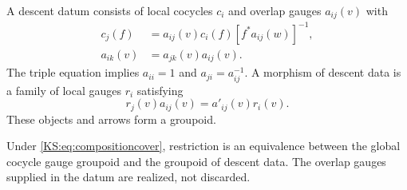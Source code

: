 A descent datum consists of local cocycles \(c_i\) and overlap gauges \(a_{ij}(v)\) with
\begin{align}
 c_j(f)&=a_{ij}(v)c_i(f)[f^*a_{ij}(w)]^{-1},\label{KS:eq:localgauge}\\
 a_{ik}(v)&=a_{jk}(v)a_{ij}(v).\label{KS:eq:triple}
\end{align}
The triple equation implies \(a_{ii}=1\) and \(a_{ji}=a_{ij}^{-1}\). A morphism of descent data is a family of local gauges \(r_i\) satisfying
\[
 r_j(v)a_{ij}(v)=a'_{ij}(v)r_i(v).
\]
These objects and arrows form a groupoid.

\begin{KStheorem}\label{KS:KS34}
Under \eqref{KS:eq:compositioncover}, restriction is an equivalence between the global cocycle gauge groupoid and the groupoid of descent data. The overlap gauges supplied in the datum are realized, not discarded.
\end{KStheorem}
